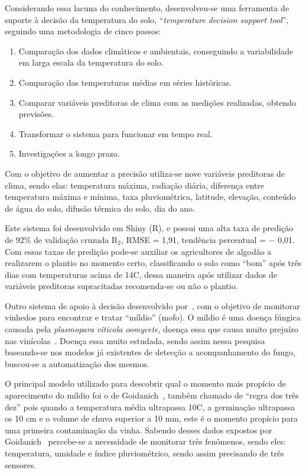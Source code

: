 \documentclass[
article,			%
12pt,				%
oneside,			%
a4paper,			%
english,			%
brazil,				%
sumario=tradicional
]{abntex2}
\begin{document}
Considerando essa lacuna do conhecimento, desenvolveu-se uma ferramenta de suporte à decisão da temperatura do solo, ``\textit{temperature decision support tool}'', seguindo uma metodologia de cinco passos:
\begin{enumerate}
  \item Comparação dos dados climáticos e ambientais, conseguindo a variabilidade em larga escala da temperatura do solo.

  \item Comparação das temperaturas médias em séries históricas.
  \item Comparar variáveis preditoras de clima com as medições realizadas, obtendo previsões.
  \item Transformar o sistema para funcionar em tempo real.
  \item Investigações a longo prazo.
\end{enumerate}

Com o objetivo de aumentar a precisão utiliza-se nove variáveis preditoras de clima, sendo elas: temperatura máxima, radiação diária, diferença entre temperatura máxima e mínima, taxa pluviométrica, latitude, elevação, conteúdo de água do solo, difusão térmica do solo, dia do ano.

Este sistema foi desenvolvido em Shiny (R), e possui uma alta taxa de predição de 92\% de validação cruzada R$_{2}$, RMSE = 1,91, tendência percentual = $-$ 0,01.
Com essas taxas de predição pode-se auxiliar os agricultores de algodão a realizarem o plantio no momento certo, classificando o solo como ``bom'' após três dias com temperaturas acima de 14\textdegree C, dessa maneira após utilizar dados de variáveis preditoras supracitadas recomenda-se ou não o plantio.

Outro sistema de apoio à decisão desenvolvido por~\citeauthor{2}, com o objetivo de monitorar vinhedos para encontrar e tratar ``míldio'' (mofo).
O míldio é uma doença fúngica causada pela \textit{plasmopara viticola oomycete}, doença essa que causa muito prejuízo nas vinícolas~\cite{2}. Doença essa muito estudada, sendo assim nessa pesquisa baseando-se nos modelos já existentes de detecção a acompanhamento do fungo, buscou-se a automatização dos mesmos.

O principal modelo utilizado para descobrir qual o momento mais propício de aparecimento do míldio foi o de Goidanich~\cite{detectando_milidio}, também chamado de ``regra dos três dez'' pois quando a temperatura média ultrapassa 10\textdegree C, a germinação ultrapassa os 10 cm e o volume de chuva superior a 10 mm, este é o momento propício para uma primeira contaminação da vinha.
Sabendo desses dados expostos por Goidanich~\cite{detectando_milidio} percebe-se a necessidade de monitorar três fenômenos, sendo eles: temperatura, umidade e índice pluviométrico, sendo assim precisando de três sensores.
\end{document}
